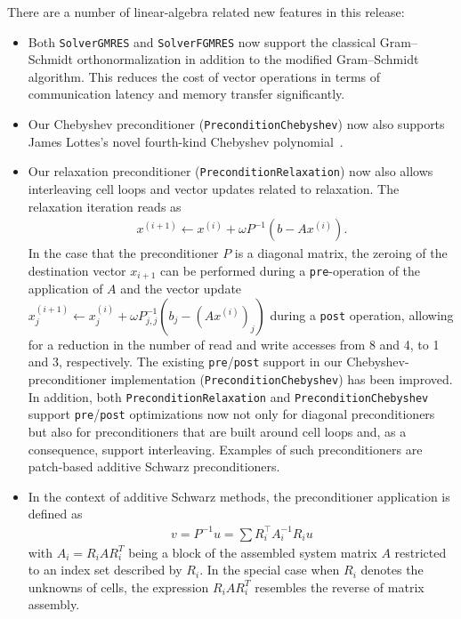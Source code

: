\documentclass{ansarticle-preprint}
\begin{document}
There are a number of linear-algebra related new features in this release:
\begin{itemize}
  \item Both \texttt{SolverGMRES} and \texttt{SolverFGMRES} now support the classical
  Gram--Schmidt orthonormalization in addition to the modified Gram--Schmidt algorithm. This
  reduces the cost of vector operations in terms of
  communication latency and memory transfer significantly.
  \item Our Chebyshev preconditioner (\texttt{PreconditionChebyshev}) now also
  supports James Lottes’s novel fourth-kind Chebyshev
  polynomial~\cite{lottes2022optimal, phillips2022optimal}.
  \item Our relaxation preconditioner (\texttt{PreconditionRelaxation}) now also
  allows interleaving cell loops and vector updates related to relaxation. The
  relaxation iteration reads as
  \begin{align*}
  x^{(i+1)} \gets x^{(i)} + \omega P^{-1}(b-Ax^{(i)}).
  \end{align*}
  In the case that the preconditioner $P$ is a diagonal matrix, the zeroing of
  the destination vector $x_{i+1}$ can be performed during a
  \texttt{pre}-operation  of the application of $A$
  and the vector update $x^{(i+1)}_j \gets x^{(i)}_j + \omega P^{-1}_{j,j}(b_j-(Ax^{(i)})_j)$
  during a \texttt{post} operation, allowing for a reduction in the number of read and write
  accesses from 8 and 4, to 1 and 3, respectively. The existing \texttt{pre}/\texttt{post}
  support in our Chebyshev-preconditioner implementation (\texttt{PreconditionChebyshev})
  has been improved. In addition, both \texttt{PreconditionRelaxation} and
  \texttt{PreconditionChebyshev} support \texttt{pre}/\texttt{post} optimizations
  now not only for diagonal preconditioners but also for preconditioners that are
  built around cell loops and, as a consequence, support interleaving. Examples of
  such preconditioners are patch-based additive Schwarz preconditioners.
  \item In the context of additive Schwarz methods, the preconditioner application
  is defined as
  \begin{align*}
  v = P^{-1} u = \sum R_i^\top A_i^{-1} R_i u
  \end{align*}
  with $A_i = R_i A R_i^T$ being a block of the assembled system
  matrix $A$ restricted
  to an index set described by $R_i$. In the special case when $R_i$ denotes the unknowns
  of cells, the expression $R_i A R_i^T$ resembles the reverse of matrix
  assembly.

\end{itemize}
\end{document}
